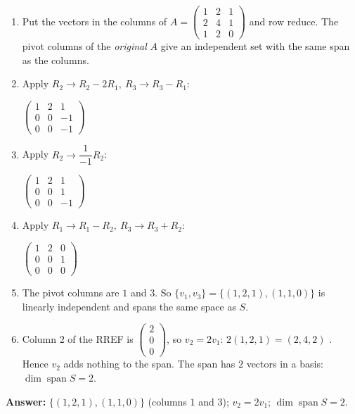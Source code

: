 \documentclass[11pt]{article}
\begin{document}
\begin{tcolorbox}[breakable,colback=ans,colframe=ansb,boxrule=0.5pt,left=4pt,right=4pt,top=2pt,bottom=2pt]\begin{enumerate}[leftmargin=3.1em,itemsep=1pt,topsep=1pt,label=\textbf{Step \arabic*.}]\item Put the vectors in the columns of $A=\begin{pmatrix}1 & 2 & 1 \\ 2 & 4 & 1 \\ 1 & 2 & 0\end{pmatrix}$ and row reduce. The pivot columns of the \emph{original} $A$ give an independent set with the same span as the columns.
\item Apply $R_2\to R_2-2R_1,\ R_3\to R_3-R_1$:\par\smallskip $\displaystyle \begin{pmatrix}1 & 2 & 1 \\ 0 & 0 & -1 \\ 0 & 0 & -1\end{pmatrix}$
\item Apply $R_2\to \dfrac{1}{-1} R_2$:\par\smallskip $\displaystyle \begin{pmatrix}1 & 2 & 1 \\ 0 & 0 & 1 \\ 0 & 0 & -1\end{pmatrix}$
\item Apply $R_1\to R_1-R_2,\ R_3\to R_3+R_2$:\par\smallskip $\displaystyle \begin{pmatrix}1 & 2 & 0 \\ 0 & 0 & 1 \\ 0 & 0 & 0\end{pmatrix}$
\item The pivot columns are $1$ and $3$. So $\{v_1,v_3\}=\{(1,2,1),(1,1,0)\}$ is linearly independent and spans the same space as $S$.
\item Column $2$ of the RREF is $\begin{pmatrix}2\\0\\0\end{pmatrix}$, so $v_2=2v_1$: $2(1,2,1)=(2,4,2)$ \checkmark. Hence $v_2$ adds nothing to the span. The span has $2$ vectors in a basis: $\dim\operatorname{span}S=2$.
\end{enumerate}\textbf{Answer:} $\{(1,2,1),(1,1,0)\}$ (columns $1$ and $3$); $v_2=2v_1$; $\dim\operatorname{span}S=2$.\end{tcolorbox}
\end{document}
